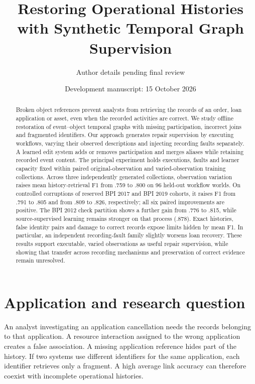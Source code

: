 \documentclass[11pt]{article}
\title{Restoring Operational Histories with Synthetic Temporal Graph Supervision}
\author{Author details pending final review}
\date{Development manuscript: 15 October 2026}
\begin{document}
\maketitle
\begin{center}\end{center}

\begin{abstract}
Broken object references prevent analysts from retrieving the records of an order, loan application or asset, even when the recorded activities are correct. We study offline restoration of event--object temporal graphs with missing participation, incorrect joins and fragmented identifiers. Our approach generates repair supervision by executing workflows, varying their observed descriptions and injecting recording faults separately. A learned edit system adds or removes participation and merges aliases while retaining recorded event content. The principal experiment holds executions, faults and learner capacity fixed within paired original-observation and varied-observation training collections. Across three independently generated collections, observation variation raises mean history-retrieval F1 from .759 to .800 on 96 held-out workflow worlds. On controlled corruptions of reserved BPI 2017 and BPI 2019 cohorts, it raises F1 from .791 to .805 and from .809 to .826, respectively; all six paired improvements are positive. The BPI 2012 check partition shows a further gain from .776 to .815, while source-supervised learning remains stronger on that process (.878). Exact histories, false identity pairs and damage to correct records expose limits hidden by mean F1. In particular, an independent recording-fault family slightly worsens loan recovery. These results support executable, varied observations as useful repair supervision, while showing that transfer across recording mechanisms and preservation of correct evidence remain unresolved.
\end{abstract}

\section{Application and research question}
An analyst investigating an application cancellation needs the records belonging to that application. A resource interaction assigned to the wrong application creates a false association. A missing application reference hides part of the history. If two systems use different identifiers for the same application, each identifier retrieves only a fragment. A high average link accuracy can therefore coexist with incomplete operational histories.
\end{document}
